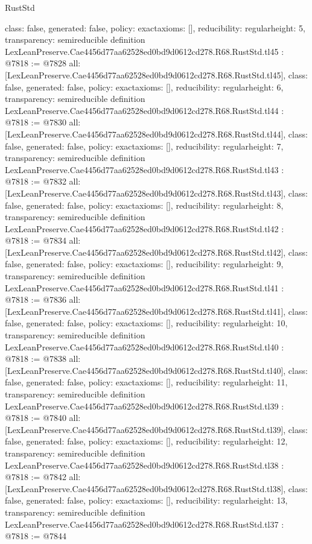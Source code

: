 \begin{lexlean}{RustStd}
\begin{coremodule}
{  class: false,
  generated: false,
  policy: exact{axioms: []},
  reducibility: regular{height: 5},
  transparency: semireducible
}
definition LexLeanPreserve.Cae4456d77aa62528ed0bd9d0612cd278.R68.RustStd.tl45 : @7818 := @7828 {
  all: [LexLeanPreserve.Cae4456d77aa62528ed0bd9d0612cd278.R68.RustStd.tl45],
  class: false,
  generated: false,
  policy: exact{axioms: []},
  reducibility: regular{height: 6},
  transparency: semireducible
}
definition LexLeanPreserve.Cae4456d77aa62528ed0bd9d0612cd278.R68.RustStd.tl44 : @7818 := @7830 {
  all: [LexLeanPreserve.Cae4456d77aa62528ed0bd9d0612cd278.R68.RustStd.tl44],
  class: false,
  generated: false,
  policy: exact{axioms: []},
  reducibility: regular{height: 7},
  transparency: semireducible
}
definition LexLeanPreserve.Cae4456d77aa62528ed0bd9d0612cd278.R68.RustStd.tl43 : @7818 := @7832 {
  all: [LexLeanPreserve.Cae4456d77aa62528ed0bd9d0612cd278.R68.RustStd.tl43],
  class: false,
  generated: false,
  policy: exact{axioms: []},
  reducibility: regular{height: 8},
  transparency: semireducible
}
definition LexLeanPreserve.Cae4456d77aa62528ed0bd9d0612cd278.R68.RustStd.tl42 : @7818 := @7834 {
  all: [LexLeanPreserve.Cae4456d77aa62528ed0bd9d0612cd278.R68.RustStd.tl42],
  class: false,
  generated: false,
  policy: exact{axioms: []},
  reducibility: regular{height: 9},
  transparency: semireducible
}
definition LexLeanPreserve.Cae4456d77aa62528ed0bd9d0612cd278.R68.RustStd.tl41 : @7818 := @7836 {
  all: [LexLeanPreserve.Cae4456d77aa62528ed0bd9d0612cd278.R68.RustStd.tl41],
  class: false,
  generated: false,
  policy: exact{axioms: []},
  reducibility: regular{height: 10},
  transparency: semireducible
}
definition LexLeanPreserve.Cae4456d77aa62528ed0bd9d0612cd278.R68.RustStd.tl40 : @7818 := @7838 {
  all: [LexLeanPreserve.Cae4456d77aa62528ed0bd9d0612cd278.R68.RustStd.tl40],
  class: false,
  generated: false,
  policy: exact{axioms: []},
  reducibility: regular{height: 11},
  transparency: semireducible
}
definition LexLeanPreserve.Cae4456d77aa62528ed0bd9d0612cd278.R68.RustStd.tl39 : @7818 := @7840 {
  all: [LexLeanPreserve.Cae4456d77aa62528ed0bd9d0612cd278.R68.RustStd.tl39],
  class: false,
  generated: false,
  policy: exact{axioms: []},
  reducibility: regular{height: 12},
  transparency: semireducible
}
definition LexLeanPreserve.Cae4456d77aa62528ed0bd9d0612cd278.R68.RustStd.tl38 : @7818 := @7842 {
  all: [LexLeanPreserve.Cae4456d77aa62528ed0bd9d0612cd278.R68.RustStd.tl38],
  class: false,
  generated: false,
  policy: exact{axioms: []},
  reducibility: regular{height: 13},
  transparency: semireducible
}
definition LexLeanPreserve.Cae4456d77aa62528ed0bd9d0612cd278.R68.RustStd.tl37 : @7818 := @7844 {
}
\end{coremodule}
\end{lexlean}
